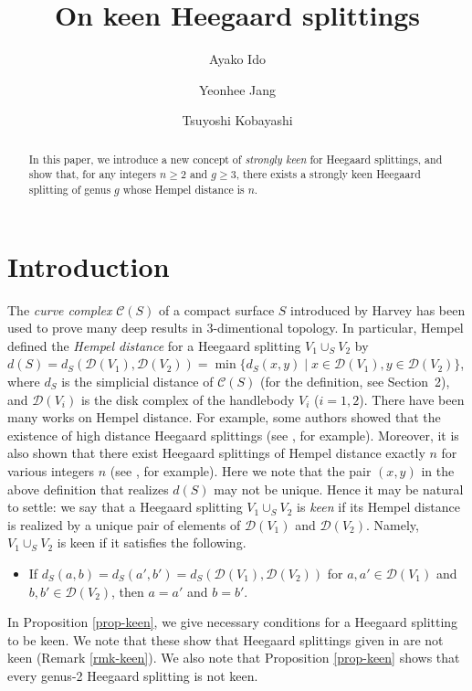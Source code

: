 \documentclass[]{aspm}
\title[On keen Heegaard splittings]
{On keen Heegaard splittings}
\author[A. Ido]{Ayako Ido}
\author[Y. Jang]{Yeonhee Jang}
\author[T. Kobayashi]{Tsuyoshi Kobayashi}
\date{\empty}
\begin{document}
\begin{abstract}
In this paper, we introduce a new concept of {\it strongly keen} for Heegaard splittings, and show that, for any integers $n\geq 2$ and $g\geq 3$, there exists a strongly keen Heegaard splitting of genus $g$ whose Hempel distance is $n$. 
\end{abstract}

\maketitle


\section{Introduction}

The {\it curve complex} $\mathcal{C}(S)$ of a compact surface $S$ introduced by Harvey \cite{Ha} has been used to prove many deep results in 3-dimentional topology. 
In particular, Hempel \cite{He} defined the {\it Hempel distance} for a Heegaard splitting $V_{1}\cup_{S} V_{2}$ by $d(S)=d_{S}(\mathcal{D}(V_{1}),\mathcal{D}(V_{2}))=\min\{d_S(x, y)\mid x\in\mathcal{D}(V_{1}), y\in\mathcal{D}(V_{2})\}$,
where $d_{S}$ is the simplicial distance of $\mathcal{C}(S)$ (for the definition, see Section~2), and $\mathcal{D}(V_{i})$ is the disk complex of the handlebody $V_{i}$ ($i=1, 2$). 
There have been many works on Hempel distance. 
For example, some authors showed that the existence of high distance Heegaard splittings (see \cite{AS, E, He}, for example). 
Moreover, it is also shown that there exist Heegaard splittings of Hempel distance exactly $n$ for various integers $n$ (see \cite{BS, IJK, Jo, QZG, Yos}, for example).
Here we note that the pair $(x, y)$  in the above definition that realizes $d(S)$ may not be unique. 
Hence it may be natural to settle: we say that a Heegaard splitting $V_{1}\cup_{S}V_{2}$ is {\it keen} if its Hempel distance is realized by a unique pair of elements of $\mathcal{D}(V_{1})$ and $\mathcal{D}(V_{2})$.
Namely, $V_{1}\cup_S V_{2}$ is keen if it satisfies the following.
\begin{itemize}
\item If $d_S(a,b)=d_S(a',b')=d_S(\mathcal{D}(V_{1}),\mathcal{D}(V_{2}))$ for $a,a'\in\mathcal{D}(V_{1})$ and $b,b'\in\mathcal{D}(V_{2})$, then $a=a'$ and $b=b'$.
\end{itemize}
In Proposition \ref{prop-keen}, we give necessary conditions for a Heegaard splitting to be keen. We note that these show that Heegaard splittings given in \cite{IJK, Jo, QZG} are not keen (Remark \ref{rmk-keen}). 
We also note that Proposition \ref{prop-keen} shows that every genus-2 Heegaard splitting is not keen. 
\end{document}
